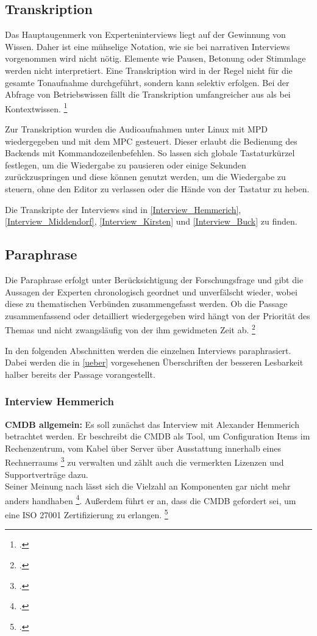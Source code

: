 \subsection{Transkription}
Das Hauptaugenmerk von Experteninterviews liegt auf der Gewinnung von Wissen. Daher ist eine mühselige Notation, wie sie bei narrativen Interviews vorgenommen wird nicht nötig. Elemente wie Pausen, Betonung oder Stimmlage werden nicht interpretiert.
Eine Transkription wird in der Regel nicht für die gesamte Tonaufnahme durchgeführt, sondern kann selektiv erfolgen. Bei der Abfrage von Betriebswissen fällt die Transkription umfangreicher aus als bei Kontextwissen. \footcite[Vgl.][455\psq]{Meuser_1991_Interview}

Zur Transkription wurden die Audioaufnahmen unter Linux mit \acf{MPD} wiedergegeben und mit dem \acf{MPC} gesteuert. Dieser erlaubt die Bedienung des Backends mit Kommandozeilenbefehlen. So lassen sich globale Tastaturkürzel festlegen, um die Wiedergabe zu pausieren oder einige Sekunden zurückzuspringen und diese können genutzt werden, um die Wiedergabe zu steuern, ohne den Editor zu verlassen oder die Hände von der Tastatur zu heben.

Die Transkripte der Interviews sind in \autoref{Interview_Hemmerich}, \autoref{Interview_Middendorf}, \autoref{Interview_Kirsten} und \autoref{Interview_Buck} zu finden.


\subsection{Paraphrase}
Die Paraphrase erfolgt unter Berücksichtigung der Forschungsfrage und gibt die Aussagen der Experten chronologisch geordnet und unverfälscht wieder, wobei diese zu thematischen Verbünden zusammengefasst werden. Ob die Passage zusammenfassend oder detailliert wiedergegeben wird hängt von der Priorität des Themas und nicht zwangsläufig von der ihm gewidmeten Zeit ab.
\footcite[Vgl.][456\psq]{Meuser_1991_Interview}

In den folgenden Abschnitten werden die einzelnen Interviews paraphrasiert. Dabei werden die in \autoref{ueber} vorgesehenen Überschriften der besseren Lesbarkeit halber bereits der Passage vorangestellt.

\subsubsection{Interview Hemmerich}
\textbf{\acs{CMDB} allgemein: }Es soll zunächst das Interview mit Alexander Hemmerich betrachtet werden. Er beschreibt die \acs{CMDB} als Tool, um \glqq{}Configuration Items im Rechenzentrum, vom Kabel über Server über Ausstattung innerhalb eines Rechnerraums\grqq
\footcite[][o. \pno]{Hemm_2019}
zu verwalten und zählt auch die vermerkten Lizenzen und Supportverträge dazu.\\
Seiner Meinung nach lässt sich die Vielzahl an Komponenten \glqq{}gar nicht mehr anders handhaben\grqq
\footcite[][o. \pno]{Hemm_2019}.
Außerdem führt er an, dass die \acs{CMDB} gefordert sei, um eine ISO 27001 Zertifizierung zu erlangen.
\footcite[Vgl.][o. \pno]{Hemm_2019}

